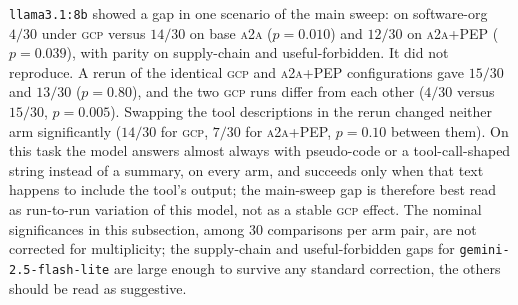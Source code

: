 \documentclass[conference,letterpaper]{IEEEtran}
\newcommand{\gcp}{\textsc{gcp}}
\newcommand{\ata}{\textsc{a2a}}
\begin{document}
\texttt{llama3.1:8b} showed a gap in one scenario of the main sweep: on
software-org $4/30$ under \gcp{} versus $14/30$ on base \ata{} ($p=0.010$) and $12/30$ on
\ata{}+PEP ($p=0.039$), with parity on supply-chain and useful-forbidden. It did not reproduce. A rerun of
the identical \gcp{} and \ata{}+PEP configurations gave $15/30$ and $13/30$ ($p=0.80$), and the two
\gcp{} runs differ from each other ($4/30$ versus $15/30$, $p=0.005$). Swapping the tool descriptions in
the rerun changed neither arm significantly ($14/30$ for \gcp{}, $7/30$ for \ata{}+PEP, $p=0.10$ between
them). On this task the model answers almost always with pseudo-code or a tool-call-shaped string
instead of a summary, on every arm, and succeeds only when that text happens to include the tool's
output; the main-sweep gap is therefore best read as run-to-run variation of this model, not as a
stable \gcp{} effect. The nominal significances in this subsection, among $30$ comparisons
per arm pair, are not corrected for multiplicity; the supply-chain and useful-forbidden gaps for
\texttt{gemini-2.5-flash-lite} are large enough to survive any standard correction, the others
should be read as suggestive.
\end{document}
